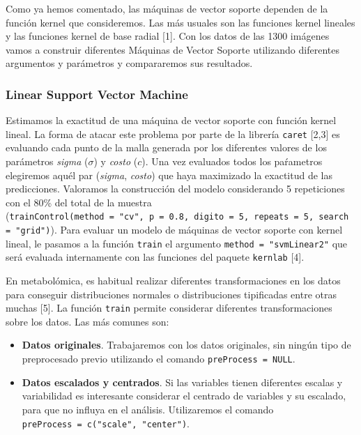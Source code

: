 \documentclass[12pt,spanish,a4paper]{article}
\numberwithin{equation}{section}
\begin{document}
Como ya hemos comentado, las máquinas de vector soporte dependen de la
función kernel que consideremos. Las más usuales son las funciones
kernel lineales y las funciones kernel de base radial {[}1{]}. Con los
datos de las 1300 imágenes vamos a construir diferentes Máquinas de
Vector Soporte utilizando diferentes argumentos y parámetros y
compararemos sus resultados.

\subsubsection{Linear Support Vector
Machine}\label{linear-support-vector-machine}

Estimamos la exactitud de una máquina de vector soporte con función
kernel lineal. La forma de atacar este problema por parte de la librería
\texttt{caret} {[}2,3{]} es evaluando cada punto de la malla generada
por los diferentes valores de los parámetros \emph{sigma} (\(\sigma\)) y
\emph{costo} (\(c\)). Una vez evaluados todos los paŕametros elegiremos
aquél par (\emph{sigma}, \emph{costo}) que haya maximizado la exactitud
de las predicciones. Valoramos la construcción del modelo considerando 5
repeticiones con el 80\% del total de la muestra
(\texttt{trainControl(method\ =\ "cv",\ p\ =\ 0.8,\ digito\ =\ 5,\ repeats\ =\ 5,\ search\ =\ "grid")}).
Para evaluar un modelo de máquinas de vector soporte con kernel lineal,
le pasamos a la función \texttt{train} el argumento
\texttt{method\ =\ "svmLinear2"} que será evaluada internamente con las
funciones del paquete \texttt{kernlab} {[}4{]}.

En metabolómica, es habitual realizar diferentes transformaciones en los
datos para conseguir distribuciones normales o distribuciones
tipificadas entre otras muchas {[}5{]}. La función \texttt{train}
permite considerar diferentes transformaciones sobre los datos. Las más
comunes son:

\begin{itemize}
\item
  \textbf{Datos originales}. Trabajaremos con los datos originales, sin
  ningún tipo de preprocesado previo utilizando el comando
  \texttt{preProcess\ =\ NULL}.
\item
  \textbf{Datos escalados y centrados}. Si las variables tienen
  diferentes escalas y variabilidad es interesante considerar el
  centrado de variables y su escalado, para que no influya en el
  análisis. Utilizaremos el comando
  \texttt{preProcess\ =\ c("scale",\ "center")}.
\end{itemize}
\end{document}
